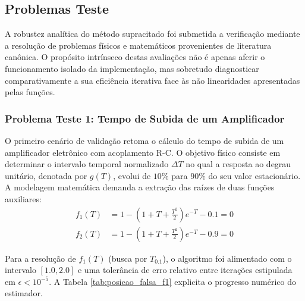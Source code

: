 \subsection{Problemas Teste}
\label{subsec:problemas_testes_posicao_falsa}

A robustez analítica do método supracitado foi submetida a verificação mediante a resolução de problemas físicos e matemáticos provenientes de literatura canônica. O propósito intrínseco destas avaliações não é apenas aferir o funcionamento isolado da implementação, mas sobretudo diagnosticar comparativamente a sua eficiência iterativa face às não linearidades apresentadas pelas funções.


\subsubsection{Problema Teste 1: Tempo de Subida de um Amplificador}
\label{subsubsec:problema_teste_1_posicao_falsa}

O primeiro cenário de validação retoma o cálculo do tempo de subida de um amplificador eletrônico com acoplamento R-C. O objetivo físico consiste em determinar o intervalo temporal normalizado $\Delta T$ no qual a resposta ao degrau unitário, denotada por $g(T)$, evolui de $10\%$ para $90\%$ do seu valor estacionário. A modelagem matemática demanda a extração das raízes de duas funções auxiliares:
\begin{align}
    f_1(T) &= 1 - \left(1 + T + \frac{T^2}{2}\right)e^{-T} - 0.1 = 0 \label{eq:f1_posicao_falsa} \\
    f_2(T) &= 1 - \left(1 + T + \frac{T^2}{2}\right)e^{-T} - 0.9 = 0 \label{eq:f2_posicao_falsa}
\end{align}

Para a resolução de $f_1(T)$ (busca por $T_{0.1}$), o algoritmo foi alimentado com o intervalo $[1.0, 2.0]$ e uma tolerância de erro relativo entre iterações estipulada em $\epsilon < 10^{-5}$. A Tabela \ref{tab:posicao_falsa_f1} explicita o progresso numérico do estimador.


